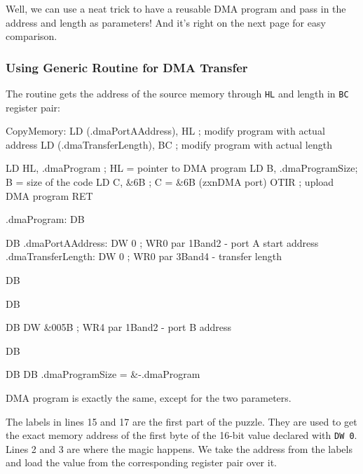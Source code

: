 {Well, we can use a neat trick to have a reusable DMA program and pass in the address and length as parameters! And it's right on the next page for easy comparison.


\subsubsection{Using Generic Routine for DMA Transfer}

The routine gets the address of the source memory through {\tt HL} and length in {\tt BC} register pair:

\begin{tcblisting}{}
CopyMemory:
	LD (.dmaPortAAddress), HL      ; modify program with actual address
	LD (.dmaTransferLength), BC  ; modify program with actual length

	LD HL, .dmaProgram     ; HL = pointer to DMA program
	LD B, .dmaProgramSize; B = size of the code
	LD C, &6B              ; C = &6B (zxnDMA port)
	OTIR                   ; upload DMA program
	RET

.dmaProgram:
	DB %

	DB %
.dmaPortAAddress:
	DW 0                   ; WR0 par 1Band2 - port A start address
.dmaTransferLength:
	DW 0                   ; WR0 par 3Band4 - transfer length

	DB %

	DB %

	DB %
	DW &005B               ; WR4 par 1Band2 - port B address

	DB %

	DB %
	DB %
.dmaProgramSize = &-.dmaProgram
\end{tcblisting}

DMA program is exactly the same, except for the two  parameters.

The labels in lines 15 and 17 are the first part of the puzzle. They are used to get the exact memory address of the first byte of the 16-bit value declared with {\tt DW 0}. Lines 2 and 3 are where the magic happens. We take the address from the labels and load the value from the corresponding register pair over it.

}
